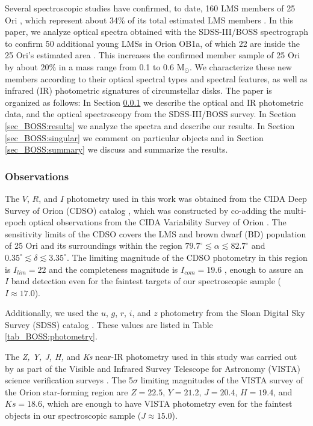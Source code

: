 \documentclass[12pt]{article}
\newcounter{subsubsubsection}[subsubsection]
\begin{document}
Several spectroscopic studies have confirmed, to date, 160 LMS members of 25 Ori \citep{Briceno2005,Briceno2007,Biazzo2011,Downes2014,Downes2015}, which represent about 34\% of its total estimated LMS members \citep{Downes2014}. In this paper, we analyze optical spectra obtained with the SDSS-III/BOSS spectrograph to confirm 50 additional young LMSs in Orion OB1a, of which 22 are inside the 25 Ori's estimated area \citep[$1^\circ$ radius; ][]{Briceno2005,Briceno2007}. This increases the confirmed member sample of 25 Ori by about 20\% in a mass range from 0.1 to 0.6 M$_\odot$. We characterize these new members according to their optical spectral types and spectral features, as well as infrared (IR) photometric signatures of circumstellar disks. The paper is organized as follows: In Section \ref{sec_BOSS:observations} we describe the optical and IR photometric data, and the optical spectroscopy from the SDSS-III/BOSS survey. In Section \ref{sec_BOSS:results} we analyze the spectra and describe our results. In Section \ref{sec_BOSS:singular} we comment on particular objects and in Section \ref{sec_BOSS:summary} we discuss and summarize the results.

\subsubsection{Observations}
\label{sec_BOSS:observations}

\label{sec_BOSS:Optphot}
The $V$, $R$, and $I$ photometry used in this work was obtained from the CIDA Deep Survey of Orion (CDSO) catalog \citep{Downes2014}, which was constructed by co-adding the multi-epoch optical observations from the CIDA Variability Survey of Orion \citep[CVSO; ][]{Briceno2005,Mateu2012}. The sensitivity limits of the CDSO covers the LMS and brown dwarf (BD) population of 25 Ori and its surroundings within the region $79.7^\circ\lesssim\alpha\lesssim82.7^\circ$ and $0.35^\circ\lesssim\delta\lesssim3.35^\circ$. The limiting magnitude of the CDSO photometry in this region is $I_{lim}=22$ and the completeness magnitude is $I_{com}=19.6$ \citep{Downes2014}, enough to assure an $I$ band detection even for the faintest targets of our spectroscopic sample ($I\approx17.0$).

Additionally, we used the $u$, $g$, $r$, $i$, and $z$ photometry from the Sloan Digital Sky Survey (SDSS) catalog \citep[][]{Finkbeiner2004,Ahn2012}. These values are listed in Table \ref{tab_BOSS:photometry}.

\label{sec_BOSS:IRphot}
The \textit{Z, Y, J, H,} and \textit{Ks} near-IR photometry used in this study was carried out by \citet{Petr-Gotzens2011} as part of the Visible and Infrared Survey Telescope for Astronomy (VISTA) science verification surveys \citep{Arnaboldi2010}. The 5$\sigma$ limiting magnitudes of the VISTA survey of the Orion star-forming region are $Z=22.5$, $Y=21.2$, $J=20.4$, $H=19.4$, and $Ks=18.6$, which are enough to have VISTA photometry even for the faintest objects in our spectroscopic sample ($J\approx15.0$).
\end{document}
